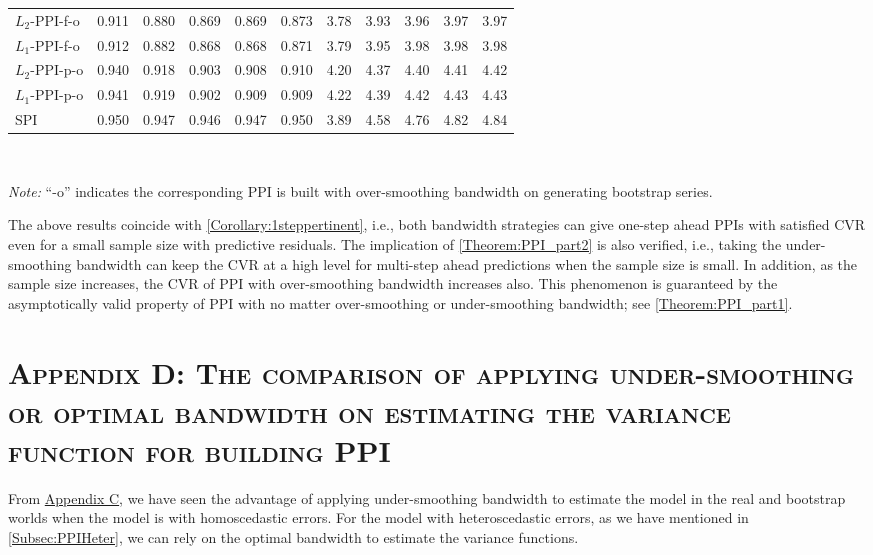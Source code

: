 \documentclass[a4paper]{article}
\begin{document}
\begin{table}[htbp]
\begin{tabular}{lcccccccccc}
  $L_2$-PPI-f-o & 0.911 & 0.880 & 0.869 & 0.869 & 0.873   & 3.78 & 3.93 & 3.96 & 3.97 & 3.97 \\ 
  $L_1$-PPI-f-o & 0.912 & 0.882 & 0.868 & 0.868 & 0.871  & 3.79 & 3.95 & 3.98 & 3.98 & 3.98  \\ 
  $L_2$-PPI-p-o & 0.940 & 0.918 & 0.903 & 0.908 & 0.910  & 4.20 & 4.37 & 4.40 & 4.41 & 4.42  \\ 
  $L_1$-PPI-p-o & 0.941 & 0.919 & 0.902 & 0.909 & 0.909 & 4.22 & 4.39 & 4.42 & 4.43 & 4.43 \\ 
  SPI & 0.950 & 0.947 & 0.946 & 0.947 & 0.950  & 3.89 & 4.58 & 4.76 & 4.82 & 4.84  \\ 
       \bottomrule
    \end{tabular}\\
      \raggedright
     \textit{Note:}  ``-o'' indicates the corresponding PPI is built with over-smoothing bandwidth on generating bootstrap series. 
\end{table}
The above results coincide with \cref{Corollary:1steppertinent}, i.e., both bandwidth strategies can give one-step ahead PPIs with satisfied CVR even for a small sample size with predictive residuals. The implication of \cref{Theorem:PPI_part2} is also verified, i.e., taking the under-smoothing bandwidth can keep the CVR at a high level for multi-step ahead predictions when the sample size is small. In addition, as the sample size increases, the CVR of PPI with over-smoothing bandwidth increases also. This phenomenon is guaranteed by the asymptotically valid property of PPI with no matter over-smoothing or under-smoothing bandwidth; see \cref{Theorem:PPI_part1}. 

\newpage
\section*{\textsc{Appendix D: The comparison of applying under-smoothing or optimal bandwidth on estimating the variance function for building PPI}}\label{Appendix:optbandwidthonestvar}

From \hyperref[Appendix:diffoverunderband]{Appendix C}, we have seen the advantage of applying under-smoothing bandwidth to estimate the model in the real and bootstrap worlds when the model is with homoscedastic errors. For the model with heteroscedastic errors, as we have mentioned in \cref{Subsec:PPIHeter}, we can rely on the optimal bandwidth to estimate the variance functions. 
\end{document}
